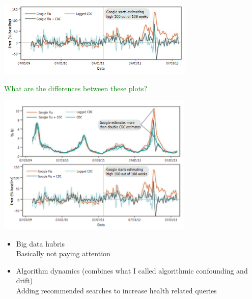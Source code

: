 \documentclass[aspectratio=169]{beamer}
\begin{document}
\begin{frame}

\begin{center}
\includegraphics[width=\textwidth]{figures/lazer_parable_2014_fig1b}
\end{center}

\end{frame}
\begin{frame}

\textcolor{green}{What are the differences between these plots?}

\begin{center}
\includegraphics[width=0.7\textwidth]{figures/lazer_parable_2014_fig1}
\end{center}

\end{frame}
\begin{frame}

\begin{itemize}
\item Big data hubris\\
Basically not paying attention
\pause
\item Algorithm dynamics (combines what I called algorithmic confounding and drift)\\
Adding recommended searches to increase health related queries
\end{itemize}

\end{frame}
\end{document}
